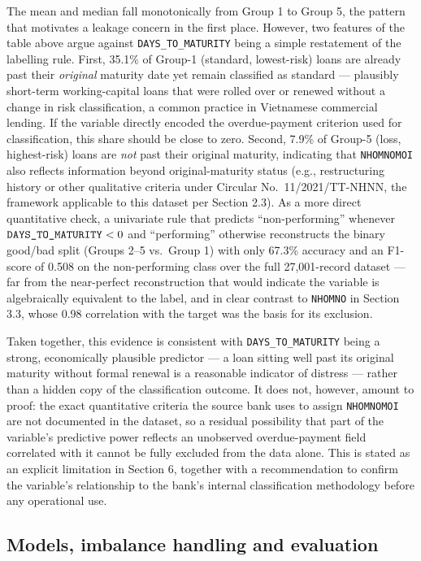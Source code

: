 \documentclass[11pt,a4paper]{article}
\begin{document}
The mean and median fall monotonically from Group 1 to Group 5, the pattern that motivates a leakage concern in the first place. However, two features of the table above argue against \texttt{DAYS\_TO\_MATURITY} being a simple restatement of the labelling rule. First, 35.1\% of Group-1 (standard, lowest-risk) loans are already past their \textit{original} maturity date yet remain classified as standard --- plausibly short-term working-capital loans that were rolled over or renewed without a change in risk classification, a common practice in Vietnamese commercial lending. If the variable directly encoded the overdue-payment criterion used for classification, this share should be close to zero. Second, 7.9\% of Group-5 (loss, highest-risk) loans are \textit{not} past their original maturity, indicating that \texttt{NHOMNOMOI} also reflects information beyond original-maturity status (e.g., restructuring history or other qualitative criteria under Circular No.\ 11/2021/TT-NHNN, the framework applicable to this dataset per Section 2.3). As a more direct quantitative check, a univariate rule that predicts ``non-performing'' whenever $\text{\texttt{DAYS\_TO\_MATURITY}} < 0$ and ``performing'' otherwise reconstructs the binary good/bad split (Groups 2--5 vs.\ Group 1) with only 67.3\% accuracy and an F1-score of 0.508 on the non-performing class over the full 27{,}001-record dataset --- far from the near-perfect reconstruction that would indicate the variable is algebraically equivalent to the label, and in clear contrast to \texttt{NHOMNO} in Section 3.3, whose 0.98 correlation with the target was the basis for its exclusion.

Taken together, this evidence is consistent with \texttt{DAYS\_TO\_MATURITY} being a strong, economically plausible predictor --- a loan sitting well past its original maturity without formal renewal is a reasonable indicator of distress --- rather than a hidden copy of the classification outcome. It does not, however, amount to proof: the exact quantitative criteria the source bank uses to assign \texttt{NHOMNOMOI} are not documented in the dataset, so a residual possibility that part of the variable's predictive power reflects an unobserved overdue-payment field correlated with it cannot be fully excluded from the data alone. This is stated as an explicit limitation in Section 6, together with a recommendation to confirm the variable's relationship to the bank's internal classification methodology before any operational use.

\subsection{Models, imbalance handling and evaluation}
\end{document}
